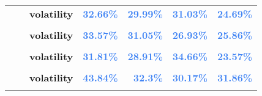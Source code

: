 \documentclass[
  authoryear,
  preprint,
  3p]{elsarticle}
\begin{document}
\begin{longtable}[t]{>{}l>{}l>{}l>{}r>{}r>{}r>{}r}
\addlinespace
\textbf{} & \textbf{} & \textbf{volatility} & \textcolor[HTML]{4285f4}{\textbf{32.66\%}} & \textcolor[HTML]{4285f4}{\textbf{29.99\%}} & \textcolor[HTML]{4285f4}{\textbf{31.03\%}} & \textcolor[HTML]{4285f4}{\textbf{24.69\%}}\\
\textbf{\cellcolor{gray!10}{}} & \textbf{\cellcolor{gray!10}{backwardation}} & \textbf{\cellcolor{gray!10}{mean}} & \textcolor[HTML]{4285f4}{\textbf{\cellcolor{gray!10}{4.12\%}}} & \textcolor[HTML]{4285f4}{\textbf{\cellcolor{gray!10}{9.25\%}}} & \textcolor[HTML]{4285f4}{\textbf{\cellcolor{gray!10}{-9.56\%}}} & \textcolor[HTML]{4285f4}{\textbf{\cellcolor{gray!10}{-2.98\%}}}\\
\textbf{} & \textbf{} & \textbf{volatility} & \textcolor[HTML]{4285f4}{\textbf{33.57\%}} & \textcolor[HTML]{4285f4}{\textbf{31.05\%}} & \textcolor[HTML]{4285f4}{\textbf{26.93\%}} & \textcolor[HTML]{4285f4}{\textbf{25.86\%}}\\
\textbf{\cellcolor{gray!10}{}} & \textbf{\cellcolor{gray!10}{contango}} & \textbf{\cellcolor{gray!10}{mean}} & \textcolor[HTML]{4285f4}{\textbf{\cellcolor{gray!10}{3.67\%}}} & \textcolor[HTML]{4285f4}{\textbf{\cellcolor{gray!10}{23.43\%}}} & \textcolor[HTML]{4285f4}{\textbf{\cellcolor{gray!10}{12.92\%}}} & \textcolor[HTML]{4285f4}{\textbf{\cellcolor{gray!10}{10.29\%}}}\\
\textbf{} & \textbf{} & \textbf{volatility} & \textcolor[HTML]{4285f4}{\textbf{31.81\%}} & \textcolor[HTML]{4285f4}{\textbf{28.91\%}} & \textcolor[HTML]{4285f4}{\textbf{34.66\%}} & \textcolor[HTML]{4285f4}{\textbf{23.57\%}}\\
\addlinespace
\textbf{\cellcolor{gray!10}{Coffee-C (IFUS)}} & \textbf{\cellcolor{gray!10}{whole period}} & \textbf{\cellcolor{gray!10}{mean}} & \textcolor[HTML]{4285f4}{\textbf{\cellcolor{gray!10}{-5.91\%}}} & \textcolor[HTML]{4285f4}{\textbf{\cellcolor{gray!10}{20.38\%}}} & \textcolor[HTML]{4285f4}{\textbf{\cellcolor{gray!10}{2.2\%}}} & \textcolor[HTML]{4285f4}{\textbf{\cellcolor{gray!10}{1.99\%}}}\\
\textbf{} & \textbf{} & \textbf{volatility} & \textcolor[HTML]{4285f4}{\textbf{43.84\%}} & \textcolor[HTML]{4285f4}{\textbf{32.3\%}} & \textcolor[HTML]{4285f4}{\textbf{30.17\%}} & \textcolor[HTML]{4285f4}{\textbf{31.86\%}}\\
\textbf{\cellcolor{gray!10}{}} & \textbf{\cellcolor{gray!10}{backwardation}} & \textbf{\cellcolor{gray!10}{mean}} & \textcolor[HTML]{4285f4}{\textbf{\cellcolor{gray!10}{4.51\%}}} & \textcolor[HTML]{4285f4}{\textbf{\cellcolor{gray!10}{26.49\%}}} & \textcolor[HTML]{4285f4}{\textbf{\cellcolor{gray!10}{2.66\%}}} & \textcolor[HTML]{4285f4}{\textbf{\cellcolor{gray!10}{14.36\%}}}\\

\end{longtable}
\end{document}
